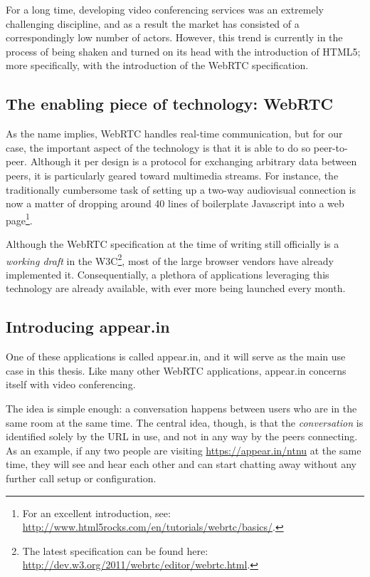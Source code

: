 For a long time, developing video conferencing services was an extremely challenging discipline, and as a result the market has consisted of a correspondingly low number of actors. However, this trend is currently in the process of being shaken and turned on its head with the introduction of HTML5; more specifically, with the introduction of the WebRTC specification.

\subsection{The enabling piece of technology: WebRTC}

As the name implies, WebRTC handles real-time communication, but for our case, the important aspect of the technology is that it is able to do so peer-to-peer. Although it per design is a protocol for exchanging arbitrary data between peers, it is particularly geared toward multimedia streams. For instance, the traditionally cumbersome task of setting up a two-way audiovisual connection is now a matter of dropping around 40 lines of boilerplate Javascript into a web page\footnote{For an excellent introduction, see: \url{http://www.html5rocks.com/en/tutorials/webrtc/basics/}.}.

Although the WebRTC specification at the time of writing still officially is a \emph{working draft} in the W3C\footnote{The latest specification can be found here: \url{http://dev.w3.org/2011/webrtc/editor/webrtc.html}.}, most of the large browser vendors have already implemented it. Consequentially, a plethora of applications leveraging this technology are already available, with ever more being launched every month.

\subsection{Introducing appear.in}

One of these applications is called appear.in, and it will serve as the main use case in this thesis. Like many other WebRTC applications, appear.in concerns itself with video conferencing.

The idea is simple enough: a conversation happens between users who are in the same room at the same time. The central idea, though, is that the \emph{conversation} is identified solely by the URL in use, and not in any way by the peers connecting. As an example, if any two people are visiting \url{https://appear.in/ntnu} at the same time, they will see and hear each other and can start chatting away without any further call setup or configuration.

